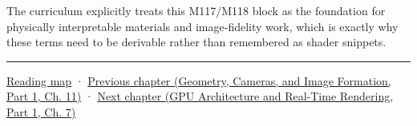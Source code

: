 The curriculum explicitly treats this M117/M118 block as the foundation for physically interpretable materials and image-fidelity work, which is exactly why these terms need to be derivable rather than remembered as shader snippets.

\begin{center}\rule{0.5\linewidth}{0.5pt}\end{center}

\hyperref[volume-reading-map]{Reading map} · \href{../03-Geometry-Cameras-and-Image-Formation-P01/main.pdf\#03-visual-computing-i-ch004-sampling-filtering-and-reconstruction}{Previous chapter (Geometry, Cameras, and Image Formation, Part 1, Ch. 11)} · \href{../06-GPU-Architecture-and-Real-Time-Rendering-P01/main.pdf\#03-visual-computing-i-ch006-from-material-data-to-gpu-bindings}{Next chapter (GPU Architecture and Real-Time Rendering, Part 1, Ch. 7)}
